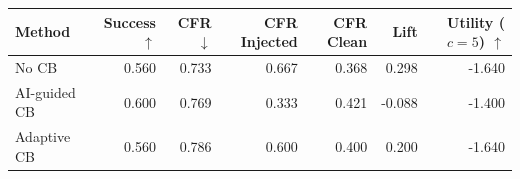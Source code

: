 \begin{tabular}{lrrrrrr}
\toprule
Method & Success $\uparrow$ & CFR $\downarrow$ & CFR Injected & CFR Clean & Lift & Utility ($c=5$) $\uparrow$ \\
\midrule
No CB & 0.560 & 0.733 & 0.667 & 0.368 & 0.298 & -1.640 \\
AI-guided CB & 0.600 & 0.769 & 0.333 & 0.421 & -0.088 & -1.400 \\
Adaptive CB & 0.560 & 0.786 & 0.600 & 0.400 & 0.200 & -1.640 \\
\bottomrule
\end{tabular}
